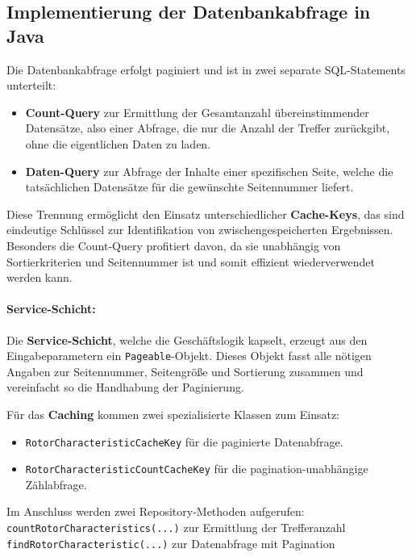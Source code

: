 \documentclass[12pt, ngerman, a4paper, numbers=noenddot]{article}
\begin{document}
\newpage
\subsection{Implementierung der Datenbankabfrage in Java}

Die Datenbankabfrage erfolgt paginiert und ist in zwei separate SQL\hyp{}Statements unterteilt:

\begin{itemize}
	\item \textbf{Count-Query} zur Ermittlung der Gesamtanzahl übereinstimmender Datensätze, also einer Abfrage, die nur die Anzahl der Treffer zurückgibt, ohne die eigentlichen Daten zu laden.
	\item \textbf{Daten-Query} zur Abfrage der Inhalte einer spezifischen Seite, welche die tatsächlichen Datensätze für die gewünschte Seitennummer liefert.
\end{itemize}

Diese Trennung ermöglicht den Einsatz unterschiedlicher \textbf{Cache-Keys}, das sind eindeutige Schlüssel zur Identifikation von zwischengespeicherten Ergebnissen. Besonders die Count-Query profitiert davon, da sie unabhängig von Sortierkriterien und Seitennummer ist und somit effizient wiederverwendet werden kann.


\paragraph{Service-Schicht:}

Die \textbf{Service-Schicht}, welche die Geschäftslogik kapselt, erzeugt aus den Eingabeparametern ein \lstinline|Pageable|-Objekt. Dieses Objekt fasst alle nötigen Angaben zur Seitennummer, Seitengröße und Sortierung zusammen und vereinfacht so die Handhabung der Paginierung.

Für das \textbf{Caching} kommen zwei spezialisierte Klassen zum Einsatz:

\begin{itemize}
	\item \lstinline|RotorCharacteristicCacheKey| für die paginierte Datenabfrage.
	\item \lstinline|RotorCharacteristicCountCacheKey| für die pagination-unabhängige Zählabfrage.
\end{itemize}

Im Anschluss werden zwei Repository-Methoden aufgerufen:
\newline \lstinline|countRotorCharacteristics(...)| zur Ermittlung der Trefferanzahl
\newline \lstinline|findRotorCharacteristic(...)| zur Datenabfrage mit Pagination
\end{document}

